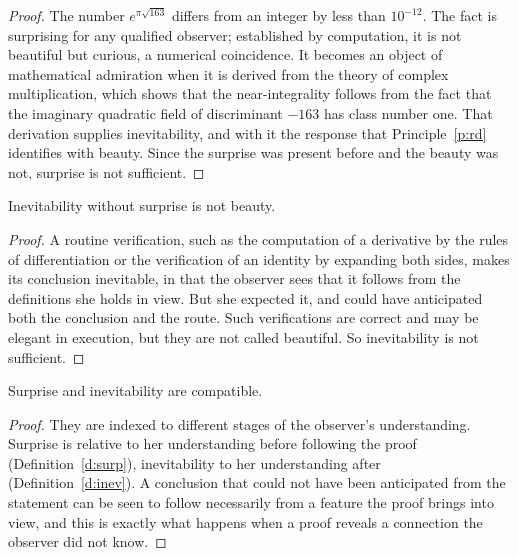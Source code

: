 \documentclass{situationist-preprint}
\begin{document}
\begin{proof}
The number $e^{\pi\sqrt{163}}$ differs from an integer by less than $10^{-12}$. The fact is surprising for any qualified observer; established by computation, it is not beautiful but curious, a numerical coincidence. It becomes an object of mathematical admiration when it is derived from the theory of complex multiplication, which shows that the near-integrality follows from the fact that the imaginary quadratic field of discriminant $-163$ has class number one. That derivation supplies inevitability, and with it the response that Principle~\ref{p:rd} identifies with beauty. Since the surprise was present before and the beauty was not, surprise is not sufficient.
\end{proof}

\begin{lemma}\label{l:inev}
Inevitability without surprise is not beauty.
\end{lemma}

\begin{proof}
A routine verification, such as the computation of a derivative by the rules of differentiation or the verification of an identity by expanding both sides, makes its conclusion inevitable, in that the observer sees that it follows from the definitions she holds in view. But she expected it, and could have anticipated both the conclusion and the route. Such verifications are correct and may be elegant in execution, but they are not called beautiful. So inevitability is not sufficient.
\end{proof}

\begin{proposition}\label{p:compat}
Surprise and inevitability are compatible.
\end{proposition}

\begin{proof}
They are indexed to different stages of the observer's understanding. Surprise is relative to her understanding before following the proof (Definition~\ref{d:surp}), inevitability to her understanding after (Definition~\ref{d:inev}). A conclusion that could not have been anticipated from the statement can be seen to follow necessarily from a feature the proof brings into view, and this is exactly what happens when a proof reveals a connection the observer did not know.
\end{proof}
\end{document}
